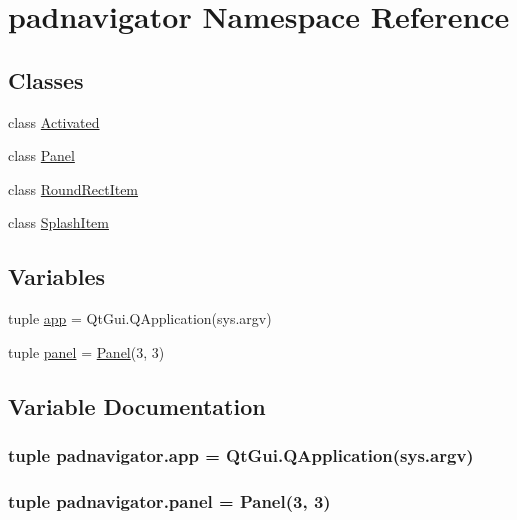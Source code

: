 \hypertarget{namespacepadnavigator}{}\section{padnavigator Namespace Reference}
\label{namespacepadnavigator}
\subsection*{Classes}
\begin{DoxyCompactItemize}
\item 
class \hyperlink{classpadnavigator_1_1Activated}{Activated}
\item 
class \hyperlink{classpadnavigator_1_1Panel}{Panel}
\item 
class \hyperlink{classpadnavigator_1_1RoundRectItem}{Round\+Rect\+Item}
\item 
class \hyperlink{classpadnavigator_1_1SplashItem}{Splash\+Item}
\end{DoxyCompactItemize}
\subsection*{Variables}
\begin{DoxyCompactItemize}
\item 
tuple \hyperlink{namespacepadnavigator_a7c9ce59dcc2f7c454ad229c4a05c8049}{app} = Qt\+Gui.\+Q\+Application(sys.\+argv)
\item 
tuple \hyperlink{namespacepadnavigator_affc8a1a7140fbe3700679a1fd7dc7a27}{panel} = \hyperlink{classpadnavigator_1_1Panel}{Panel}(3, 3)
\end{DoxyCompactItemize}


\subsection{Variable Documentation}
\hypertarget{namespacepadnavigator_a7c9ce59dcc2f7c454ad229c4a05c8049}{}
\subsubsection[{app}]{\setlength{\rightskip}{0pt plus 5cm}tuple padnavigator.\+app = Qt\+Gui.\+Q\+Application(sys.\+argv)}\label{namespacepadnavigator_a7c9ce59dcc2f7c454ad229c4a05c8049}
\hypertarget{namespacepadnavigator_affc8a1a7140fbe3700679a1fd7dc7a27}{}
\subsubsection[{panel}]{\setlength{\rightskip}{0pt plus 5cm}tuple padnavigator.\+panel = {\bf Panel}(3, 3)}\label{namespacepadnavigator_affc8a1a7140fbe3700679a1fd7dc7a27}
